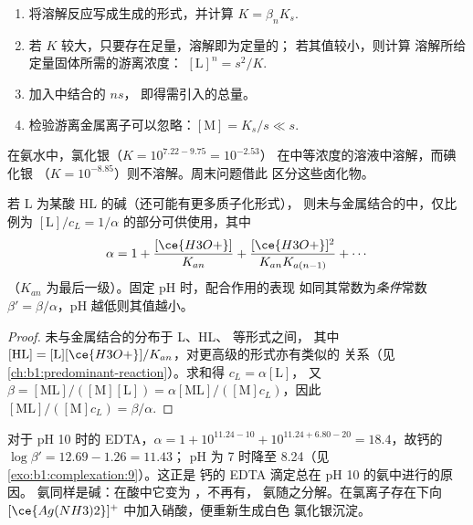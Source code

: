 \begin{method}[用配合作用溶解沉淀]\label{met:b1:complexation:dissolve-precipitate}
\begin{enumerate}
  \item 将溶解反应写成生成的形式，并计算
        $K = \beta_n K_s$.
  \item 若 $K$ 较大，只要存在足量，溶解即为定量的；
        若其值较小，则计算
        溶解所给定量固体所需的游离浓度：
        $[\mathrm{L}]^n = s^2/K$.
  \item 加入中结合的 $n s$，
        即得需引入的总量。
  \item 检验游离金属离子可以忽略：$[\mathrm{M}] = K_s/s
        \ll s$.
\end{enumerate}
\end{method}

在氨水中，氯化银（$K = 10^{7.22 - 9.75} = 10^{-2.53}$）
在中等浓度的溶液中溶解，而碘化银
（$K = 10^{-8.85}$）则不溶解。周末问题借此
区分这些卤化物。

\begin{proposition}[配合作用与酸度的对抗]\label{prop:b1:complexation:ligand-acidity}
若 $\mathrm{L}$ 为某酸 $\mathrm{HL}$ 的碱（还可能有更多质子化形式），
则未与金属结合的中，仅比例为 $[\mathrm{L}]/c_L =
1/\alpha$ 的部分可供使用，其中
\[
  \alpha = 1 + \frac{[\ce{H3O+}]}{K_{an}} + \frac{[\ce{H3O+}]^2}{K_{an}K_{a(n-1)}}
  + \cdots
\]
（$K_{an}$ 为最后一级）。固定 pH 时，配合作用的表现
如同其常数为\emph{条件}常数
$\beta' = \beta/\alpha$，pH 越低则其值越小。
\end{proposition}

\begin{proof}
未与金属结合的分布于 L、HL、 等形式之间，
其中 $[\mathrm{HL}] = [\mathrm{L}][\ce{H3O+}]/K_{an}$，对更高级的形式亦有类似的
关系（见\cref{ch:b1:predominant-reaction}）。求和得 $c_L = \alpha[\mathrm{L}]$，
又 $\beta = [\mathrm{ML}]/([\mathrm{M}][\mathrm{L}]) =
\alpha[\mathrm{ML}]/([\mathrm{M}]c_L)$，因此 $[\mathrm{ML}]/([\mathrm{M}]c_L)
= \beta/\alpha$.
\end{proof}

对于 pH 10 时的 EDTA，$\alpha = 1 + 10^{11.24 - 10} + 10^{11.24 + 6.80 - 20}
= 18.4$，故钙的 $\log\beta' = 12.69 - 1.26 = 11.43$；
pH 为 7 时降至 8.24（见\cref{exo:b1:complexation:9}）。这正是
钙的 EDTA 滴定总在 pH 10 的氨中进行的原因。
氨同样是碱：在酸中它变为 ，不再有，
氨随之分解。在氯离子存在下向
$[\ce{Ag(NH3)2}]^{+}$ 中加入硝酸，便重新生成白色
氯化银沉淀。

